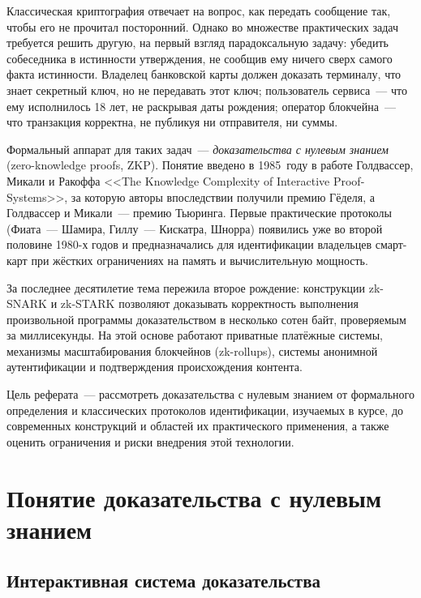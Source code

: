 \documentclass[14pt,a4paper]{extarticle}
\begin{document}

\tableofcontents


Классическая криптография отвечает на вопрос, как передать сообщение так, чтобы его не
прочитал посторонний. Однако во множестве практических задач требуется решить другую,
на первый взгляд парадоксальную задачу: убедить собеседника в истинности утверждения,
не сообщив ему ничего сверх самого факта истинности. Владелец банковской карты должен
доказать терминалу, что знает секретный ключ, но не передавать этот ключ; пользователь
сервиса~--- что ему исполнилось 18 лет, не раскрывая даты рождения; оператор блокчейна~---
что транзакция корректна, не публикуя ни отправителя, ни суммы.

Формальный аппарат для таких задач~--- \emph{доказательства с нулевым знанием}
(zero-knowledge proofs, ZKP). Понятие введено в 1985~году в работе Голдвассер, Микали и
Ракоффа <<The Knowledge Complexity of Interactive Proof-Systems>>, за которую авторы
впоследствии получили премию Гёделя, а Голдвассер и Микали~--- премию Тьюринга.
Первые практические протоколы (Фиата~--- Шамира, Гиллу~--- Кискатра, Шнорра)
появились уже во второй половине 1980-х годов и предназначались для идентификации
владельцев смарт-карт при жёстких ограничениях на память и вычислительную мощность.

За последнее десятилетие тема пережила второе рождение: конструкции zk-SNARK и
zk-STARK позволяют доказывать корректность выполнения произвольной программы
доказательством в несколько сотен байт, проверяемым за миллисекунды. На этой основе
работают приватные платёжные системы, механизмы масштабирования блокчейнов
(zk-rollups), системы анонимной аутентификации и подтверждения происхождения контента.

Цель реферата~--- рассмотреть доказательства с нулевым знанием от формального
определения и классических протоколов идентификации, изучаемых в курсе, до современных
конструкций и областей их практического применения, а также оценить ограничения и
риски внедрения этой технологии.

\section{Понятие доказательства с нулевым знанием}

\subsection{Интерактивная система доказательства}
\end{document}

